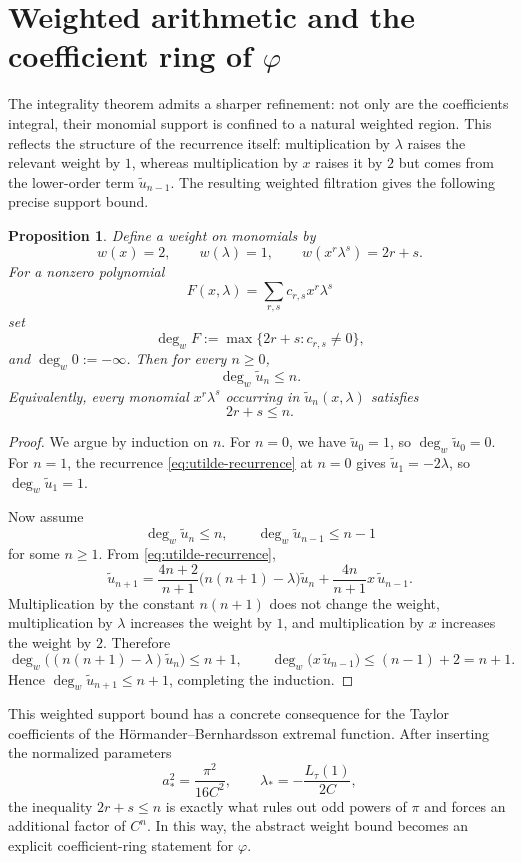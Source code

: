\documentclass[11pt,letterpaper]{amsart}
\numberwithin{equation}{section}
\theoremstyle{plain}
\newtheorem{proposition}[theorem]{Proposition}
\theoremstyle{remark}
\begin{document}
\section{Weighted arithmetic and the coefficient ring of \texorpdfstring{$\varphi$}{phi}}
\label{sec:weighted-arithmetic}

The integrality theorem admits a sharper refinement: not only are the coefficients integral,
their monomial support is confined to a natural weighted region. This reflects the structure of
the recurrence itself: multiplication by \(\lambda\) raises the relevant weight by \(1\),
whereas multiplication by \(x\) raises it by \(2\) but comes from the lower-order term
\(\widetilde u_{n-1}\). The resulting weighted filtration gives the following precise support
bound.

\begin{proposition}\label{prop:weighted-support}
Define a weight on monomials by
\[
w(x)=2,
\qquad
w(\lambda)=1,
\qquad
w(x^r\lambda^s)=2r+s.
\]
For a nonzero polynomial
\[
F(x,\lambda)=\sum_{r,s} c_{r,s}x^r\lambda^s
\]
set
\[
\deg_w F:=\max\{2r+s:c_{r,s}\ne 0\},
\]
and \(\deg_w 0:=-\infty\). Then for every \(n\ge 0\),
\[
\deg_w\widetilde u_n\le n.
\]
Equivalently, every monomial \(x^r\lambda^s\) occurring in \(\widetilde u_n(x,\lambda)\)
satisfies
\[
2r+s\le n.
\]
\end{proposition}

\begin{proof}
We argue by induction on \(n\). For \(n=0\), we have \(\widetilde u_0=1\), so
\(\deg_w\widetilde u_0=0\). For \(n=1\), the recurrence \eqref{eq:utilde-recurrence} at \(n=0\)
gives \(\widetilde u_1=-2\lambda\), so \(\deg_w\widetilde u_1=1\).

Now assume
\[
\deg_w\widetilde u_n\le n,
\qquad
\deg_w\widetilde u_{n-1}\le n-1
\]
for some \(n\ge 1\). From \eqref{eq:utilde-recurrence},
\[
\widetilde u_{n+1}
=
\frac{4n+2}{n+1}\bigl(n(n+1)-\lambda\bigr)\widetilde u_n
+\frac{4n}{n+1}x\,\widetilde u_{n-1}.
\]
Multiplication by the constant \(n(n+1)\) does not change the weight, multiplication by
\(\lambda\) increases the weight by \(1\), and multiplication by \(x\) increases the weight by \(2\).
Therefore
\[
\deg_w\bigl((n(n+1)-\lambda)\widetilde u_n\bigr)\le n+1,
\qquad
\deg_w\bigl(x\,\widetilde u_{n-1}\bigr)\le (n-1)+2=n+1.
\]
Hence \(\deg_w\widetilde u_{n+1}\le n+1\), completing the induction.
\end{proof}

This weighted support bound has a concrete consequence for the Taylor coefficients of the
H\"ormander--Bernhardsson extremal function. After inserting the normalized parameters
\[
a_*^2=\frac{\pi^2}{16C^2},
\qquad
\lambda_*=-\frac{L_\tau(1)}{2C},
\]
the inequality \(2r+s\le n\) is exactly what rules out odd powers of \(\pi\) and forces an
additional factor of \(C^n\). In this way, the abstract weight bound becomes an explicit
coefficient-ring statement for \(\varphi\).
\end{document}
